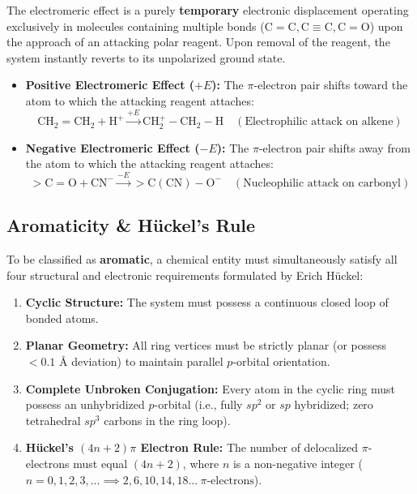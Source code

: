 \documentclass[10pt,a4paper]{article}
\begin{document}
\begin{conceptbox}
The electromeric effect is a purely \textbf{temporary} electronic displacement operating exclusively in molecules containing multiple bonds ($\mathrm{C=C}, \mathrm{C\equiv C}, \mathrm{C=O}$) upon the approach of an attacking polar reagent. Upon removal of the reagent, the system instantly reverts to its unpolarized ground state.
\begin{itemize}
  \item \textbf{Positive Electromeric Effect ($+E$):} The $\pi$-electron pair shifts toward the atom to which the attacking reagent attaches:
  \begin{equation}
    \mathrm{CH_2=CH_2} + \mathrm{H^+} \xrightarrow{+E} \mathrm{CH_2^+-CH_2-H} \quad (\text{Electrophilic attack on alkene})
  \end{equation}
  \item \textbf{Negative Electromeric Effect ($-E$):} The $\pi$-electron pair shifts away from the atom to which the attacking reagent attaches:
  \begin{equation}
    >\mathrm{C=O} + \mathrm{CN^-} \xrightarrow{-E} >\mathrm{C(CN)-O^-} \quad (\text{Nucleophilic attack on carbonyl})
  \end{equation}
\end{itemize}
\end{conceptbox}

\subsection{Aromaticity \& Hückel's Rule}

\begin{conceptbox}
To be classified as \textbf{aromatic}, a chemical entity must simultaneously satisfy all four structural and electronic requirements formulated by Erich Hückel:
\begin{enumerate}[leftmargin=*]
  \item \textbf{Cyclic Structure:} The system must possess a continuous closed loop of bonded atoms.
  \item \textbf{Planar Geometry:} All ring vertices must be strictly planar (or possess $< 0.1\text{ \AA}$ deviation) to maintain parallel $p$-orbital orientation.
  \item \textbf{Complete Unbroken Conjugation:} Every atom in the cyclic ring must possess an unhybridized $p$-orbital (i.e., fully $sp^2$ or $sp$ hybridized; zero tetrahedral $sp^3$ carbons in the ring loop).
  \item \textbf{Hückel's $(4n+2)\pi$ Electron Rule:} The number of delocalized $\pi$-electrons must equal $(4n + 2)$, where $n$ is a non-negative integer ($n = 0, 1, 2, 3, \dots \implies 2, 6, 10, 14, 18 \dots \ \pi\text{-electrons}$).
\end{enumerate}
\end{conceptbox}
\end{document}
